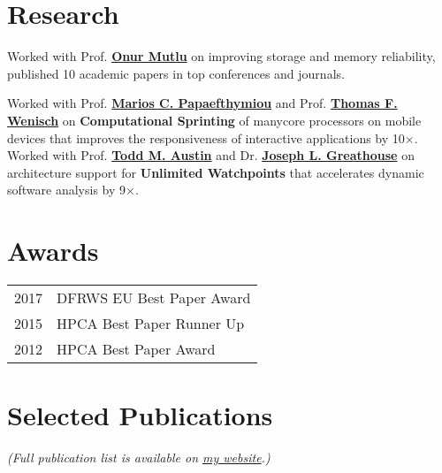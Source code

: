 \documentclass[]{resume}
\begin{document}
\begin{minipage}[t]{0.613\textwidth}

\section{Research}
Worked with Prof\@. \textbf{\href{http://users.ece.cmu.edu/~omutlu/}{Onur Mutlu}} on improving storage and memory reliability, published 10 academic papers in top conferences and journals.
\sectionsep%

Worked with Prof\@. \textbf{\href{http://web.eecs.umich.edu/~marios/}{Marios C. Papaefthymiou}} and Prof\@. \textbf{\href{http://web.eecs.umich.edu/~twenisch/}{Thomas F. Wenisch}} on \textbf{Computational Sprinting} of manycore processors on mobile devices that improves the responsiveness of interactive applications by 10$\times$.
Worked with Prof\@. \textbf{\href{http://web.eecs.umich.edu/~taustin/}{Todd M. Austin}} and Dr\@. \textbf{\href{http://www.computermachines.org/joe/}{Joseph L. Greathouse}} on architecture support for \textbf{Unlimited Watchpoints} that accelerates dynamic software analysis by 9$\times$.


\section{Awards}
\begin{tabular}{rl}
2017 & DFRWS EU Best Paper Award \\
2015 & HPCA Best Paper Runner Up \\
2012 & HPCA Best Paper Award
\end{tabular}


\section{Selected Publications}
\textit{(Full publication list is available on \href{http://www.yixinluo.com}{my website}.)}
\vspace{15pt}
\setlength{\bibsep}{0pt plus 0.3ex}


\nocite{*}
\vspace{-10pt}

\end{minipage}
\end{document}
